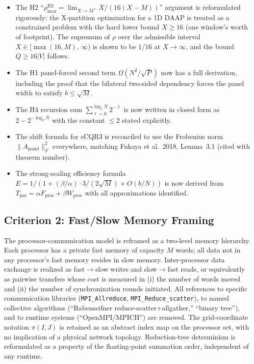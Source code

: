 \documentclass[11pt]{article}
\begin{document}
\begin{itemize}[leftmargin=2em]
  now derived with explicit $o(1)$ verification that the panel flop
  and bandwidth terms are dominated by the trailing GEMM in the entire
  admissible window $b \in [c,\, N/\sqrt{P}]$.
\item The H2 ``$\rho_{\max}^{\mathrm{H2}} = \lim_{X\to M^+} X/(16(X-M))$''
  argument is reformulated rigorously: the X-partition optimization for a
  1D DAAP is treated as a constrained problem with the hard lower bound
  $X \ge 16$ (one window's worth of footprint). The supremum of $\rho$
  over the admissible interval $X \in [\max(16, M),\,\infty)$ is shown
  to be $1/16$ at $X \to \infty$, and the bound $Q \ge 16|V|$ follows.
\item The H1 panel-forced second term $\Omega(N^2/\sqrt{P})$ now has a
  full derivation, including the proof that the bilateral two-sided
  dependency forces the panel width to satisfy $b \le \sqrt{M}$.
\item The H4 recursion sum $\sum_{\ell=0}^{\log_2 N} 2^{-\ell}$ is now
  written in closed form as $2 - 2^{-\log_2 N}$ with the constant
  $\le 2$ stated explicitly.
\item The shift formula for sCQR3 is reconciled to use the Frobenius
  norm $\|A_{\mathrm{panel}}\|_F^2$ everywhere, matching Fukaya et
  al.\ 2018, Lemma~3.1 (cited with theorem number).
\item The strong-scaling efficiency formula
  $E = 1/(1 + (\beta/\alpha)\cdot 3/(2\sqrt{M}) + O(b/N))$ is now
  derived from $T_{\mathrm{par}} = \alpha F_{\mathrm{proc}} +
  \beta W_{\mathrm{proc}}$ with all approximations identified.
\end{itemize}

\subsection*{Criterion 2: Fast/Slow Memory Framing}

The processor-communication model is reframed as a two-level memory
hierarchy. Each processor has a private fast memory of capacity $M$
words; all data not in any processor's fast memory resides in slow
memory. Inter-processor data exchange is realized as fast$\to$slow
writes and slow$\to$fast reads, or equivalently as pairwise transfers
whose cost is measured in (i) the number of words moved and (ii) the
number of synchronization rounds initiated. All references to specific
communication libraries (\texttt{MPI\_Allreduce},
\texttt{MPI\_Reduce\_scatter}), to named collective algorithms
(``Rabenseifner reduce-scatter+allgather,'' ``binary tree''), and to
runtime systems (``OpenMPI/MPICH'') are removed. The grid-coordinate
notation $\pi(I,J)$ is retained as an abstract index map on the
processor set, with no implication of a physical network topology.
Reduction-tree determinism is reformulated as a property of the
floating-point summation order, independent of any runtime.
\end{document}
